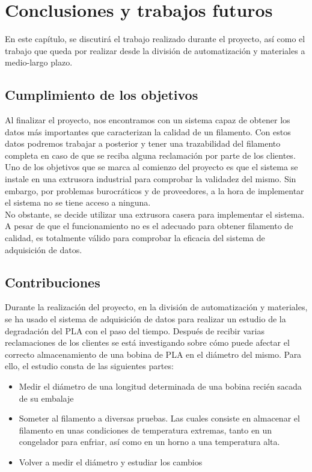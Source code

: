 \chapter{Conclusiones y trabajos futuros}
\label{cap:conclus}

En este capítulo, se discutirá el trabajo realizado durante el proyecto, así como el trabajo que queda por realizar desde la división de automatización y materiales a medio-largo plazo.

\section{Cumplimiento de los objetivos}

Al finalizar el proyecto, nos encontramos con un sistema capaz de obtener los datos más importantes que caracterizan la calidad de un filamento. Con estos datos podremos trabajar a posterior y tener una trazabilidad del filamento completa en caso de que se reciba alguna reclamación por parte de los clientes.\\

Uno de los objetivos que se marca al comienzo del proyecto es que el sistema se instale en una extrusora industrial para comprobar la validadez del mismo. Sin embargo, por problemas burocráticos y de proveedores, a la hora de implementar el sistema no se tiene acceso a ninguna.\\ 

No obstante, se decide utilizar una extrusora casera para implementar el sistema. A pesar de que el funcionamiento no es el adecuado para obtener filamento de calidad, es totalmente válido para comprobar la eficacia del sistema de adquisición de datos.

\section{Contribuciones}

Durante la realización del proyecto, en la división de automatización y materiales, se ha usado el sistema de adquisición de datos para realizar un estudio de la degradación del PLA con el paso del tiempo. Después de recibir varias reclamaciones de los clientes se está investigando sobre cómo puede afectar el correcto almacenamiento de una bobina de PLA en el diámetro del mismo. Para ello, el estudio consta de las siguientes partes:

\begin{itemize}
	\item{Medir el diámetro de una longitud determinada de una bobina recién sacada de su embalaje}
	\item{Someter al filamento a diversas pruebas. Las cuales consiste en almacenar el filamento en unas condiciones de temperatura extremas, tanto en un congelador para enfriar, así como en un horno a una temperatura alta.}
	\item{Volver a medir el diámetro y estudiar los cambios}
\end{itemize}

